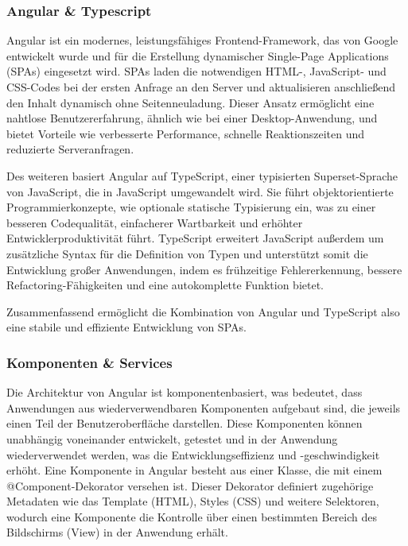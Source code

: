 \documentclass[../main.tex]{subfiles} %
\begin{document}
\subsubsection{Angular & Typescript}

Angular ist ein modernes, leistungsfähiges Frontend-Framework, das von Google entwickelt wurde und für die Erstellung dynamischer Single-Page 
Applications (SPAs) eingesetzt wird. SPAs laden die notwendigen HTML-, JavaScript- und CSS-Codes bei der ersten Anfrage an den Server und 
aktualisieren anschließend den Inhalt dynamisch ohne Seitenneuladung. Dieser Ansatz ermöglicht eine nahtlose Benutzererfahrung, ähnlich wie bei 
einer Desktop-Anwendung, und bietet Vorteile wie verbesserte Performance, schnelle Reaktionszeiten und reduzierte Serveranfragen.

Des weiteren basiert Angular auf TypeScript, einer typisierten Superset-Sprache von JavaScript, die in JavaScript umgewandelt wird. Sie führt 
objektorientierte Programmierkonzepte, wie optionale statische Typisierung ein, was zu einer besseren Codequalität, einfacherer Wartbarkeit und 
erhöhter Entwicklerproduktivität führt. TypeScript erweitert JavaScript außerdem um zusätzliche Syntax für die Definition von Typen und unterstützt 
somit die Entwicklung großer Anwendungen, indem es frühzeitige Fehlererkennung, bessere Refactoring-Fähigkeiten und eine autokomplette Funktion bietet.

Zusammenfassend ermöglicht die Kombination von Angular und TypeScript also eine stabile und effiziente Entwicklung von SPAs.

\subsubsection{Komponenten \& Services}

Die Architektur von Angular ist komponentenbasiert, was bedeutet, dass Anwendungen aus wiederverwendbaren Komponenten aufgebaut sind, die
jeweils einen Teil der Benutzeroberfläche darstellen. Diese Komponenten können unabhängig voneinander entwickelt, getestet und in der
Anwendung wiederverwendet werden, was die Entwicklungseffizienz und -geschwindigkeit erhöht. Eine Komponente in Angular besteht aus einer 
Klasse, die mit einem @Component-Dekorator versehen ist. Dieser Dekorator definiert zugehörige Metadaten wie das Template (HTML), Styles (CSS) 
und weitere Selektoren, wodurch eine Komponente die Kontrolle über einen bestimmten Bereich des Bildschirms (View) in der Anwendung erhält.
\end{document}
